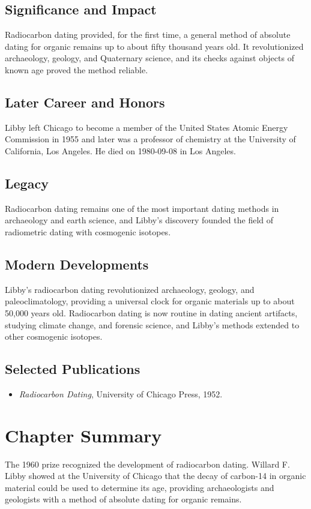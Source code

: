 \subsection*{Significance and Impact}

Radiocarbon dating provided, for the first time, a general method of absolute dating for organic remains up to about fifty thousand years old. It revolutionized archaeology, geology, and Quaternary science, and its checks against objects of known age proved the method reliable.

\subsection*{Later Career and Honors}

Libby left Chicago to become a member of the United States Atomic Energy Commission in 1955 and later was a professor of chemistry at the University of California, Los Angeles. He died on 1980-09-08 in Los Angeles.

\subsection*{Legacy}

Radiocarbon dating remains one of the most important dating methods in archaeology and earth science, and Libby's discovery founded the field of radiometric dating with cosmogenic isotopes.

\subsection*{Modern Developments}

Libby's radiocarbon dating revolutionized archaeology, geology, and paleoclimatology, providing a universal clock for organic materials up to about 50,000 years old. Radiocarbon dating is now routine in dating ancient artifacts, studying climate change, and forensic science, and Libby's methods extended to other cosmogenic isotopes.

\subsection*{Selected Publications}

\begin{itemize}

\item \emph{Radiocarbon Dating}, University of Chicago Press, 1952.

\end{itemize}

\clearpage

\section*{Chapter Summary}

The 1960 prize recognized the development of radiocarbon dating. Willard F. Libby showed at the University of Chicago that the decay of carbon-14 in organic material could be used to determine its age, providing archaeologists and geologists with a method of absolute dating for organic remains.

